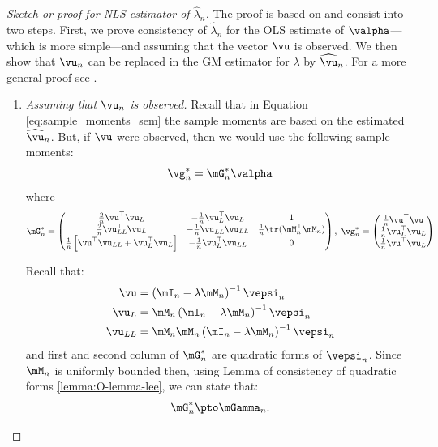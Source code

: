 \documentclass[english,12pt]{book}\usepackage[]{graphicx}\usepackage[]{xcolor}
\begin{document}
\begin{proof}[Sketch or proof for NLS estimator of $\widehat{\lambda}_n$]
The proof is based on \cite{kelejian2017spatial} and consist into two steps. First, we prove consistency of $\widehat{\lambda}_n$ for the OLS estimate of $\valpha$---which is more simple---and assuming that the vector $\vu$ is observed. We then show that $\vu_n$ can be replaced in the GM estimator for $\lambda$ by $\widehat{\vu}_n$. For a more general proof see \citet{kelejian1998generalized, kelejian1999generalized}.
\begin{enumerate}
  \item \emph{Assuming that $\vu_n$ is observed.} Recall that in Equation \eqref{eq:sample_moments_sem} the sample moments are based on the estimated $\widehat{\vu}_n$. But, if $\vu$ were observed, then we would use the following sample moments:
\begin{equation*}
  \vg_n^* = \mG_n^*\valpha
\end{equation*}
%
where 
\begin{equation*}
  \mG_n^* = \begin{pmatrix}
   \frac{2}{n}\vu^\top\vu_L & -\frac{1}{n}\vu_L^\top\vu_L & 1\\
   \frac{2}{n}\vu^\top_{LL}\vu_L & -\frac{1}{n}\vu_{LL}^\top\vu_{LL} & \frac{1}{n} \tr(\mM^\top_n\mM_n)\\
   \frac{1}{n}\left[\vu^\top\vu_{LL} + \vu_L^\top\vu_L\right] & -\frac{1}{n}\vu_{L}^\top\vu_{LL} & 0
        \end{pmatrix},\; 
  \vg_n^* = \begin{pmatrix}
  \frac{1}{n}\vu^\top\vu \\
  \frac{1}{n}\vu^\top_L\vu_L \\
  \frac{1}{n}\vu^\top\vu_L
        \end{pmatrix}
\end{equation*}

Recall that:
\begin{equation*}
  \begin{aligned}
    \vu & = \left(\mI_n - \lambda\mM_n\right)^{-1}\vepsi_n \\
    \vu_L & = \mM_n\left(\mI_n - \lambda\mM_n\right)^{-1}\vepsi_n \\
    \vu_{LL} & = \mM_n\mM_n\left(\mI_n - \lambda\mM_n\right)^{-1}\vepsi_n
  \end{aligned}
\end{equation*}
%
and first and second column of $\mG^*_n$ are quadratic forms of $\vepsi_n$. Since $\mM_n$ is uniformly bounded then, using Lemma of consistency of quadratic forms \ref{lemma:O-lemma-lee}, we can state that:
\begin{equation*}
\mG^*_n\pto \mGamma_n.
\end{equation*}


\end{enumerate}
\end{proof}
\end{document}
